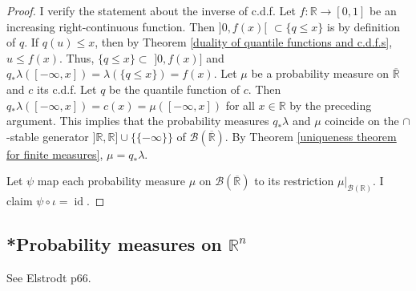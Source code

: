 \documentclass[11pt, a4paper, openany]{book}
\theoremstyle{definition}
\DeclareMathOperator{\id}{id}
\newcommand{\er}{\overline{\mathbb{R}}}
\begin{document}
    \begin{proof}
        
        I verify the statement about the inverse of \textup{c.d.f.} Let $f:\mathbb{R}\rightarrow[0,1]$ be an increasing right-continuous function. Then $]0,f(x)[\,\,\subset\{q\leqslant x\}$ is by definition of $q$. If $q(u)\leqslant x$, then by Theorem \ref{duality of quantile functions and c.d.f.s}, $u\leqslant f(x)$. Thus, $\{q\leqslant x\}\subset \,\,]0,f(x)]$ and $q_*\lambda([-\infty,x])=\lambda(\{q\leqslant x\})=f(x)$. Let $\mu$ be a probability measure on $\er$ and $c$ its c.d.f. Let $q$ be the quantile function of $c$. Then $q_*\lambda([-\infty,x])=c(x)=\mu([-\infty,x])$ for all $x\in\mathbb{R}$ by the preceding argument. This implies that the probability measures $q_*\lambda$ and $\mu$ coincide on the $\cap$-stable generator $]\mathbb{R},\mathbb{R}]\cup\{\{-\infty\}\}$ of $\mathscr{B}(\er)$. By Theorem \ref{uniqueness theorem for finite measures}, $\mu=q_*\lambda$.  
            
        Let $\psi$ map each probability measure $\mu$ on $\mathscr{B}(\er)$ to its restriction $\mu|_{\mathscr{B}(\mathbb{R})}$. I claim $\psi\circ\iota=\id$.
    \end{proof}
\subsection{*Probability measures on \texorpdfstring{$\mathbb{R}^n$}{Rn}}
    See Elstrodt p66.
\end{document}
